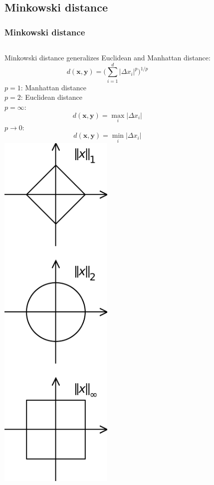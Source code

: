 \documentclass[Nike]{tuberlinbeamer}
\newcommand{\x}{\boldsymbol{x}}
\newcommand{\y}{\boldsymbol{y}}
\begin{document}
\subsection{Minkowski distance}
\begin{frame}[t]
  \frametitle{Minkowski distance}
  \begin{columns}[T]
      Minkowski distance generalizes Euclidean and Manhattan distance:
      \begin{equation*}
        d(\x, \y) = \Bigg(\sum_{i=1}^d |\Delta x_i|^p\Bigg)^{1/p}
      \end{equation*}
      \pause
      $p=1$: Manhattan distance\\
      $p=2$: Euclidean distance\\
      \pause
      $p=\infty$:
      \begin{equation*}
        d(\x, \y) = \max_{i} |\Delta x_i|
      \end{equation*}
      \pause
      $p\rightarrow0$:
      \begin{equation*}
        d(\x, \y) = \min_{i} |\Delta x_i|
      \end{equation*}
      \pause
      \includegraphics[width=0.5\textwidth]{minkowski_norms.pdf}\\

\end{columns}
\end{frame}
\end{document}

